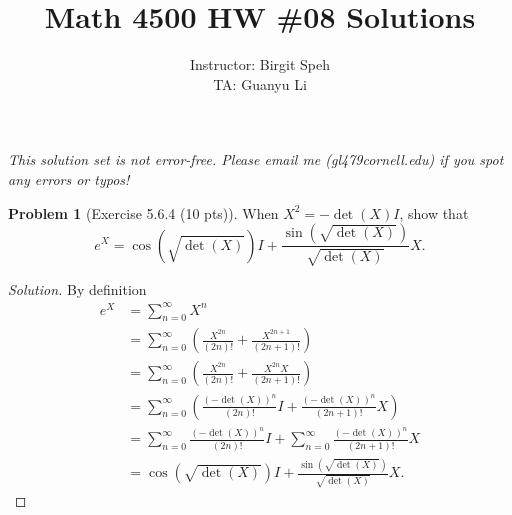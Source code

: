 \documentclass{article}
\title{Math 4500 HW \#08 Solutions}
\author{Instructor: Birgit Speh\\ TA: Guanyu Li}
\date{}
\theoremstyle{definition}
\newtheorem{problem}{Problem}
\theoremstyle{plain}
\begin{document}
\maketitle\par

\emph{This solution set is not error-free. Please email me (gl479\MVAt cornell.edu) if you spot any errors or typos!}

\begin{problem}[Exercise 5.6.4 (10 pts)]
When $X^2=-\det(X)I$, show that
\begin{displaymath}
e^X=\cos(\sqrt{\det(X)})I+\frac{\sin(\sqrt{\det(X)})}{\sqrt{\det(X)}}X.
\end{displaymath}
\end{problem}
\begin{adjustwidth}{0.7cm}{}
\color{blue}
\begin{proof}[Solution]
By definition
\begin{align*}
e^X&=\sum_{n=0}^{\infty}X^n\\
&=\sum_{n=0}^{\infty}\left(\frac{X^{2n}}{(2n)!}+\frac{X^{2n+1}}{(2n+1)!}\right)\\
&=\sum_{n=0}^{\infty}\left(\frac{X^{2n}}{(2n)!}+\frac{X^{2n}X}{(2n+1)!}\right)\\
&=\sum_{n=0}^{\infty}\left(\frac{(-\det(X))^n}{(2n)!}I+\frac{(-\det(X))^n}{(2n+1)!}X\right)\\
&=\sum_{n=0}^{\infty}\frac{(-\det(X))^n}{(2n)!}I+\sum_{n=0}^{\infty}\frac{(-\det(X))^n}{(2n+1)!}X\\
&=\cos(\sqrt{\det(X)})I+\frac{\sin(\sqrt{\det(X)})}{\sqrt{\det(X)}}X.
\end{align*}
\color{black}
\end{proof}
\end{adjustwidth}
\end{document}
